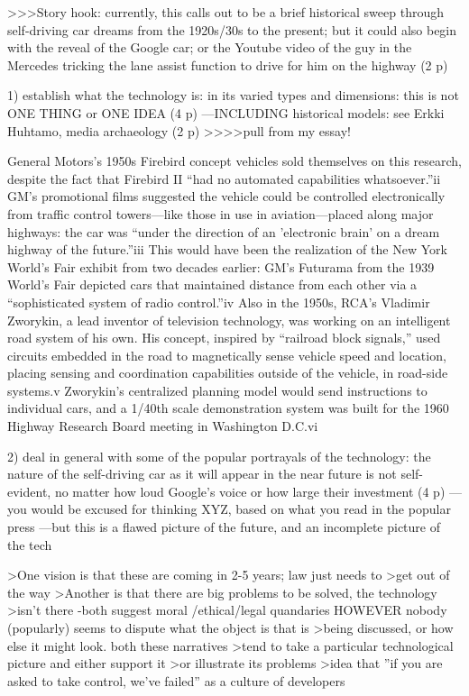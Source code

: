 >>>Story hook: currently, this calls out to be a brief historical
sweep through self-driving car dreams from the 1920s/30s to the
present; but it could also begin with the reveal of the Google car; or
the Youtube video of the guy in the Mercedes tricking the lane assist
function to drive for him on the highway (2 p)

1) establish what the technology is: in its varied types and
dimensions: this is not ONE THING or ONE IDEA (4 p)
---INCLUDING historical models: see Erkki Huhtamo, media archaeology
(2 p)
>>>>pull from my essay!

General Motors's 1950s Firebird concept
vehicles sold themselves on this research, despite the fact that
Firebird II ``had no automated capabilities whatsoever.''ii GM's
promotional films suggested the vehicle could be controlled
electronically from traffic control towers—like those in use in
aviation—placed along major highways: the car was ``under the direction
of an 'electronic brain' on a dream highway of the future.''iii This
would have been the realization of the New York World's Fair exhibit
from two decades earlier: GM's Futurama from the 1939 World's Fair
depicted cars that maintained distance from each other via a
“sophisticated system of radio control.”iv Also in the 1950s, RCA's
Vladimir Zworykin, a lead inventor of television technology, was
working on an intelligent road system of his own. His concept,
inspired by “railroad block signals,” used circuits embedded in the
road to magnetically sense vehicle speed and location, placing sensing
and coordination capabilities outside of the vehicle, in road-side
systems.v Zworykin's centralized planning model would send
instructions to individual cars, and a 1/40th scale demonstration
system was built for the 1960 Highway Research Board meeting in
Washington D.C.vi




2) deal in general with some of the popular portrayals of the
technology: the nature of the self-driving car as it will appear in
the near future is not self-evident, no matter how loud Google's voice
or how large their investment (4 p)
---you would be excused for thinking XYZ, based on what you read in
the popular press
---but this is a flawed picture of the future, and an incomplete
picture of the tech

>One vision is that these are coming in 2-5 years; law just needs to
>get out of the way
>Another is that there are big problems to be solved, the technology
>isn't there
-both suggest moral /ethical/legal quandaries
HOWEVER nobody (popularly) seems to dispute what the object is that is
>being discussed, or how else it might look. both these narratives
>tend to take a particular technological picture and either support it
>or illustrate its problems
>idea that ''if you are asked to take control, we've failed'' as a culture of developers

